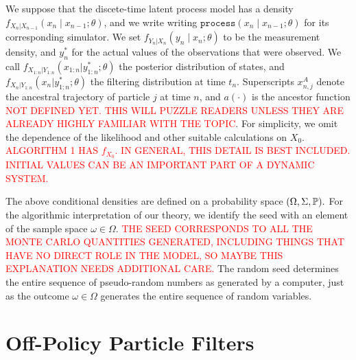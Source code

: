 \documentclass[9pt,twocolumn,twoside]{pnas-new}
\newcommand\ei[1]{\textcolor{red}{#1}}
\begin{document}

We suppose that the discete-time latent process model has a density $f_{X_n|X_{n-1}}\left(x_{n} \mid x_{n-1}; \theta\right)$, and we write writing $\texttt{process}\left(x_n\mid x_{n-1}; \theta\right)$ for its corresponding simulator.
We set $f_{Y_n|X_n}\left(y_n \mid x_n; \theta\right)$ to be the measurement density, and $y_n^*$ for the actual values of the observations that were observed.
We call $f_{X_{1:n}|Y_{1:n}}(x_{1:n}|y_{1:n}^*; \theta)$ the posterior distribution of states, and $f_{X_{n}|Y_{1:n}}(x_n|y_{1:n}^*; \theta)$ the filtering distribution at time $t_n$.
Superscripts $x_{n,j}^A$ denote the ancestral trajectory of particle $j$ at time $n$, and $a(\cdot)$ is the ancestor function \ei{NOT DEFINED YET. THIS WILL PUZZLE READERS UNLESS THEY ARE ALREADY HIGHLY FAMILIAR WITH THE TOPIC}.
For simplicity, we omit the dependence of the likelihood and other suitable calculations on $X_0$. \ei{ALGORITHM 1 HAS $f_{X_0}$. IN GENERAL, THIS DETAIL IS BEST INCLUDED. INITIAL VALUES CAN BE AN IMPORTANT PART OF A DYNAMIC SYSTEM.}

The above conditional densities are defined on a probability space $(\Omega, \Sigma, \mathbb{P}).$ 
For the algorithmic interpretation of our theory, we identify the seed with an element of the sample space $\omega \in \Omega$.
\ei{THE SEED CORRESPONDS TO ALL THE MONTE CARLO QUANTITIES GENERATED, INCLUDING THINGS THAT HAVE NO DIRECT ROLE IN THE MODEL, SO MAYBE THIS EXPLANATION NEEDS ADDITIONAL CARE.}
The random seed determines the entire sequence of pseudo-random numbers as generated by a computer, just as the outcome $\omega\in\Omega$ generates the entire sequence of random variables.



\section{Off-Policy Particle Filters}
\end{document}
